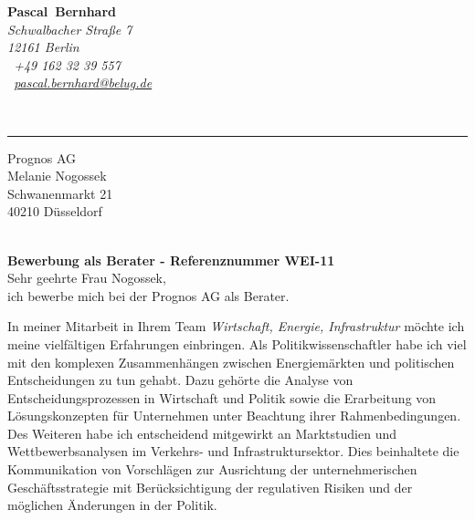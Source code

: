 \documentclass[11pt,a4paper]{article}
\def\firstname{Pascal}
\def\familyname{Bernhard}
\begin{document}
\sffamily   %
\hfill%
\begin{minipage}[t]{.6\textwidth}
	\raggedleft%
	{\bfseries {\color{firstnamecolor}\firstname}~{\color{familynamecolor}\familyname}}\\[.35ex]
	\small\itshape%
	Schwalbacher Straße 7\\
	12161 Berlin\\[.35ex]
	\Mobilefone~+49 162 32 39 557 \\
	\Letter~\href{mailto:pascal.bernhard@belug.de}{pascal.bernhard@belug.de}
\end{minipage}\\[0.5em]
%
{\color{firstnamecolor}\rule{\textwidth}{.25ex}}
%
\begin{minipage}[t]{.4\textwidth}
	\raggedright%
	\vspace*{1em}
	Prognos AG \\
	Melanie Nogossek\\[.35ex]
	\small%
	Schwanenmarkt 21\\
	40210 Düsseldorf
\end{minipage}
%
\hfill
%
\begin{minipage}[t]{.4\textwidth}
	\raggedleft %
\end{minipage}\\[1em]


{\bfseries \color{familynamecolor}Bewerbung als Berater - Referenznummer WEI-11}\\[0.75em]

Sehr geehrte Frau Nogossek,\\[0.5em]
%
ich bewerbe mich bei der Prognos AG als Berater.

In meiner Mitarbeit in Ihrem Team \textsl{Wirtschaft, Energie, Infrastruktur} möchte ich meine vielfältigen Erfahrungen einbringen. Als Politikwissenschaftler habe ich viel mit den komplexen Zusammen­hängen zwischen Energiemärkten und politischen Entscheidungen zu tun gehabt. Dazu gehörte die Analyse von Entscheidungsprozessen in Wirtschaft und Politik sowie die Erarbeitung von Lösungskonzepten für Unternehmen unter Beachtung ihrer Rahmenbedingungen. Des Weiteren habe ich entscheidend mitgewirkt an Marktstudien und Wettbewerbsanalysen im Verkehrs- und Infrastruktursektor. Dies beinhaltete die Kommunikation von Vorschlägen zur Ausrichtung der unter­neh­merischen Geschäfts­strategie mit Berücksichtigung der regulativen Risiken und der möglichen Änderungen in der Politik.
\end{document}
